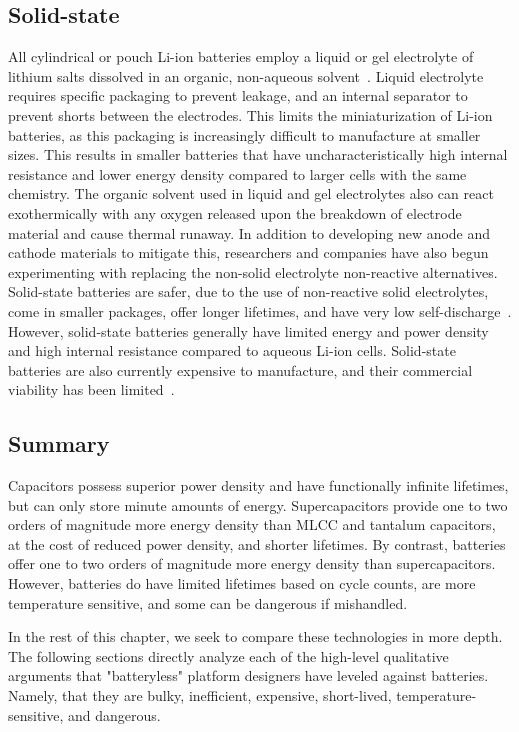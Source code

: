 \subsection{Solid-state}
All cylindrical or pouch Li-ion batteries employ a liquid or gel electrolyte of lithium salts dissolved in an organic, non-aqueous solvent~\cite{doughty2012general}. Liquid electrolyte requires specific packaging to prevent leakage, and an internal separator to prevent shorts between the electrodes. This limits the miniaturization of Li-ion batteries, as this packaging is increasingly difficult to manufacture at smaller sizes. This results in smaller batteries that have uncharacteristically high internal resistance and lower energy density compared to larger cells with the same chemistry.
The organic solvent used in liquid and gel electrolytes also can react exothermically with any oxygen released upon the breakdown of electrode material and cause thermal runaway. In addition to developing new anode and cathode materials to mitigate this, researchers and companies have also begun experimenting with replacing the non-solid electrolyte non-reactive alternatives. Solid-state batteries are safer, due to the use of non-reactive solid electrolytes, come in smaller packages, offer longer lifetimes, and have very low self-discharge~\cite{kim2015review}. However, solid-state batteries generally have limited energy and power density and high internal resistance compared to aqueous Li-ion cells. Solid-state batteries are also currently expensive to manufacture, and their commercial viability has been limited~\cite{kim2015review}.

\subsection{Summary}
Capacitors possess superior power density and have functionally infinite lifetimes, but can only store minute amounts of energy. Supercapacitors provide one to two orders of magnitude more energy density than MLCC and tantalum capacitors, at the cost of reduced power density, and shorter lifetimes. By contrast, batteries offer one to two orders of magnitude more energy density than supercapacitors. However, batteries do have limited lifetimes based on cycle counts, are more temperature sensitive, and some can be dangerous if mishandled. 

In the rest of this chapter, we seek to compare these technologies in more depth. The following sections directly analyze each of the high-level qualitative arguments that "batteryless" platform designers have leveled against batteries. Namely, that they are bulky, inefficient, expensive, short-lived, temperature-sensitive, and dangerous. 


